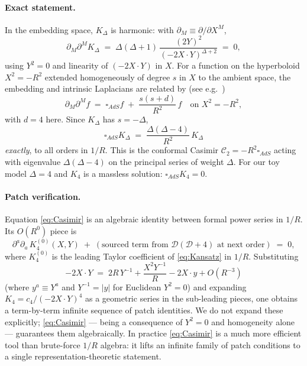\documentclass[11pt]{article}
\newcommand{\bdy}{\partial}
\renewcommand{\Box}{\square}
\begin{document}
\paragraph{Exact statement.} In the embedding space, $K_\Delta$ is harmonic: with $\bdy_M\equiv\bdy/\bdy X^M$,
\begin{equation}
    \bdy_M\bdy^M K_\Delta \;=\; \Delta(\Delta+1)\,\frac{(2Y)^2}{(-2X\cdot Y)^{\Delta+2}} \;=\; 0,
\end{equation}
using $Y^2=0$ and linearity of $(-2X\cdot Y)$ in $X$. For a function on the hyperboloid $X^2=-R^2$ extended homogeneously of degree $s$ in $X$ to the ambient space, the embedding and intrinsic Laplacians are related by (see e.g.~\cite{Costa:2014kfa})
\begin{equation}
    \bdy_M\bdy^M f \;=\; \Box_{AdS} f \;+\; \frac{s(s+d)}{R^2}\,f \quad \text{on } X^2=-R^2,
\end{equation}
with $d=4$ here. Since $K_\Delta$ has $s=-\Delta$,
\begin{equation}
    \boxed{\;\Box_{AdS} K_\Delta \;=\; \frac{\Delta(\Delta-4)}{R^2}\,K_\Delta\;}
    \label{eq:Casimir}
\end{equation}
\emph{exactly}, to all orders in $1/R$. This is the conformal Casimir $\mathcal{C}_2 = -R^2\Box_{AdS}$ acting with eigenvalue $\Delta(\Delta-4)$ on the principal series of weight $\Delta$. For our toy model $\Delta=4$ and $K_4$ is a massless solution: $\Box_{AdS}K_4 = 0$.

\paragraph{Patch verification.} Equation \cref{eq:Casimir} is an algebraic identity between formal power series in $1/R$. Its $O(R^{0})$ piece is
\begin{equation}
    \bdy^a\bdy_a\, K_4^{(0)}(X,Y) \;+\; (\text{sourced term from }\mathcal{D}(\mathcal{D}+4)\text{ at next order}) \;=\; 0,
\end{equation}
where $K_4^{(0)}$ is the leading Taylor coefficient of \cref{eq:Kansatz} in $1/R$. Substituting
\begin{equation}
-2X\cdot Y \;=\; 2R\,Y^{-1} + \frac{X^2 Y^{-1}}{R} - 2 X\cdot y + O(R^{-3})
\end{equation}
(where $y^a\equiv Y^a$ and $Y^{-1}=|y|$ for Euclidean $Y^2=0$) and expanding $K_4=c_4/(-2X\cdot Y)^4$ as a geometric series in the sub-leading pieces, one obtains a term-by-term infinite sequence of patch identities. We do not expand these explicitly; \cref{eq:Casimir} --- being a consequence of $Y^2=0$ and homogeneity alone --- guarantees them algebraically. In practice \cref{eq:Casimir} is a much more efficient tool than brute-force $1/R$ algebra: it lifts an infinite family of patch conditions to a single representation-theoretic statement.
\end{document}
